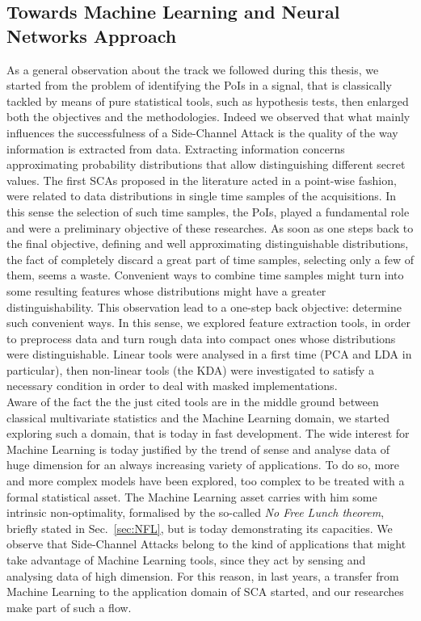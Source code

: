 \subsection{Towards Machine Learning and Neural Networks Approach}\label{sec:NN_intro} 
As a general observation about the track we followed during this thesis, we started from the problem of identifying the PoIs in a signal, that is classically tackled by means of pure statistical tools, such as hypothesis tests,  then enlarged both the objectives and the methodologies. Indeed we observed that what mainly influences the successfulness of a Side-Channel Attack is the quality of the way information is extracted from data. Extracting information concerns approximating probability distributions that allow distinguishing different secret values. The first SCAs proposed in the literature acted in a point-wise fashion, \ie were related to data distributions in single time samples of the acquisitions. In this sense the selection of such time samples, the PoIs, played a fundamental role and were a preliminary objective of these researches. As soon as one steps back to the final objective, \ie defining and well approximating distinguishable distributions, the fact of completely discard a great part of time samples, selecting only a few of them, seems a waste. Convenient ways to combine time samples might turn into some resulting features whose distributions might have a greater distinguishability. This observation lead to a one-step back objective: determine such convenient ways. In this sense, we explored feature extraction tools, in order to preprocess data and turn rough data into compact ones whose distributions were distinguishable. Linear tools were analysed in a first time (PCA and LDA in particular), then non-linear tools (the KDA) were investigated to satisfy a necessary condition in order to deal with masked implementations. \\

Aware of the fact the the just cited tools are in the middle ground between classical multivariate statistics and the Machine Learning domain, we started exploring such a domain, that is today  in fast development. The wide interest for Machine Learning is today justified by the trend of sense and analyse data of huge dimension for an always increasing variety of applications. To do so, more and more complex models have been explored, too complex to be treated with a formal statistical asset. The Machine Learning asset carries with him some intrinsic non-optimality, formalised by the so-called \emph{No Free Lunch theorem}, briefly stated in Sec.~\ref{sec:NFL}, but is today demonstrating its capacities. We observe that Side-Channel Attacks belong to the kind of applications that might take advantage of Machine Learning tools, since they act by sensing and analysing data of high dimension. For this reason, in last years, a transfer from Machine Learning to the application domain of SCA started, and our researches make part of such a flow. \\

